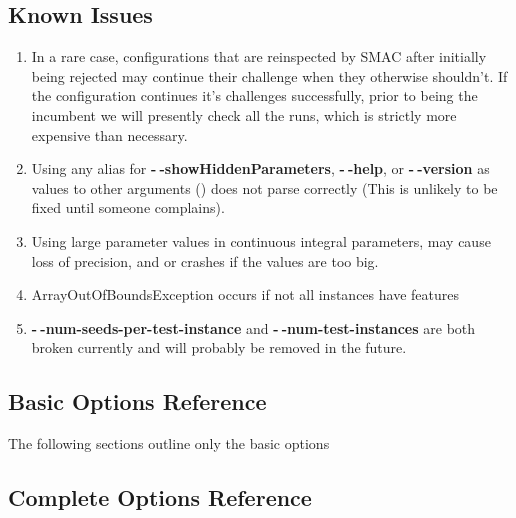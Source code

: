 \documentclass[11pt,letterpaper,oneside]{article}
\begin{document}
\subsection{Known Issues}
\label{known-issues}
\begin{enumerate}
\item In a rare case, configurations that are reinspected by SMAC after initially being rejected may continue their challenge when they otherwise shouldn't. If the configuration continues it's challenges successfully, prior to being the incumbent we will presently check all the runs, which is strictly more expensive than necessary.

\item Using any alias for \textbf{-$~\!$-showHiddenParameters}, \textbf{-$~\!$-help}, or \textbf{-$~\!$-version} as values to other arguments () does not parse correctly (This is unlikely to be fixed until someone complains).
\item Using large parameter values in continuous integral parameters, may cause loss of precision, and or crashes if the values are too big.

\item ArrayOutOfBoundsException occurs if not all instances have features

\item \textbf{-$~\!$-num-seeds-per-test-instance} and \textbf{-$~\!$-num-test-instances} are both broken currently and will probably be removed in the future.


\end{enumerate}

\clearpage


\subsection{Basic Options Reference}
The following sections outline only the basic options
\label{sec:options-basic-ref}



\clearpage

\subsection{Complete Options Reference}
\label{sec:options-ref}

\end{document}
